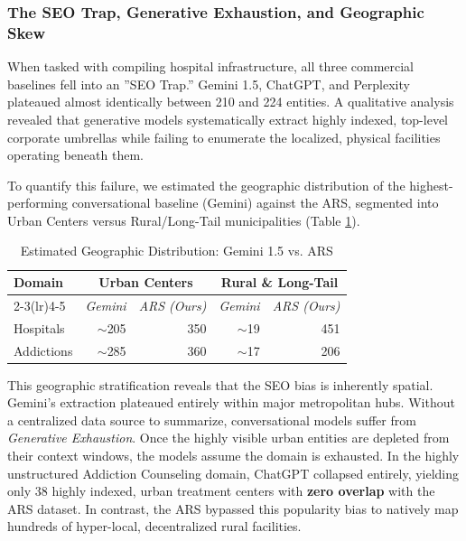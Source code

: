\documentclass[12pt,oneside]{report}
\begin{document}
\subsubsection{The SEO Trap, Generative Exhaustion, and Geographic Skew}
When tasked with compiling hospital infrastructure, all three commercial baselines fell into an ''SEO Trap.'' Gemini 1.5, ChatGPT, and Perplexity plateaued almost identically between 210 and 224 entities. A qualitative analysis revealed that generative models systematically extract highly indexed, top-level corporate umbrellas while failing to enumerate the localized, physical facilities operating beneath them. 

To quantify this failure, we estimated the geographic distribution of the highest-performing conversational baseline (Gemini) against the ARS, segmented into Urban Centers versus Rural/Long-Tail municipalities (Table \ref{tab:llm_geo_estimate}).

\begin{table}[htbp]
\caption{Estimated Geographic Distribution: Gemini 1.5 vs. ARS}
\label{tab:llm_geo_estimate}
\centering
\begin{tabularx}{\textwidth}{@{}Xrrrr@{}}
\toprule
\textbf{Domain} & \multicolumn{2}{c}{\textbf{Urban Centers}} & \multicolumn{2}{c}{\textbf{Rural \& Long-Tail}} \\
\cmidrule(lr){2-3}\cmidrule(lr){4-5}
 & \textit{Gemini} & \textit{ARS (Ours)} & \textit{Gemini} & \textit{ARS (Ours)} \\
\midrule
Hospitals & $\sim$205 & 350 & $\sim$19 & 451 \\
Addictions & $\sim$285 & 360 & $\sim$17 & 206 \\
\bottomrule
\end{tabularx}
\end{table}

This geographic stratification reveals that the SEO bias is inherently spatial. Gemini's extraction plateaued entirely within major metropolitan hubs. Without a centralized data source to summarize, conversational models suffer from \textit{Generative Exhaustion}. Once the highly visible urban entities are depleted from their context windows, the models assume the domain is exhausted. In the highly unstructured Addiction Counseling domain, ChatGPT collapsed entirely, yielding only 38 highly indexed, urban treatment centers with \textbf{zero overlap} with the ARS dataset. In contrast, the ARS bypassed this popularity bias to natively map hundreds of hyper-local, decentralized rural facilities.
\end{document}
